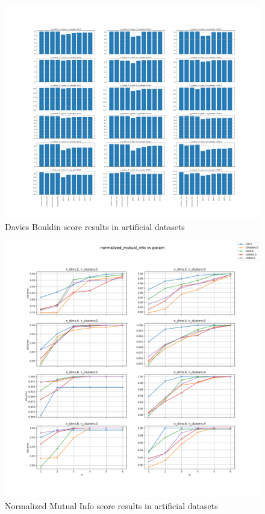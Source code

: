 \begin{figure}[!ht]
    \includegraphics[width=\linewidth]{images/additional_experiments/silouette_score.png}
    \caption{Davies Bouldin score results in artificial datasets}
    \label{fig:davies_bouldin_score}
\end{figure}

\begin{figure}[!ht]
    \includegraphics[width=\linewidth]{images/additional_experiments/normalized_mutual_info.png}
    \caption{Normalized Mutual Info score results in artificial datasets}
    \label{fig:normalized_mutual_info}
\end{figure}

